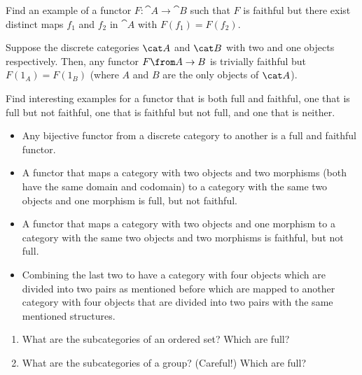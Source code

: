 \begin{exercise}
  Find an example of a functor $F : \cat{A} \to \cat{B}$ such that $F$ is faithful but there exist distinct maps $f_1$ and $f_2$ in $\cat{A}$ with $F(f_1) = F(f_2)$.
\end{exercise}

\begin{answer}
  Suppose the discrete categories $\A$ and $\B$ with two and one objects respectively. Then, any functor $F\from A\to B$ is trivially faithful but $F(1_A)=F(1_B)$ (where $A$ and $B$ are the only objects of $\A$).
\end{answer}

\begin{exercise}
  Find interesting examples for a functor that is both full and faithful, one that is full but not faithful, one that is faithful but not full, and one that is neither.
\end{exercise}

\begin{answer}
\begin{itemize}
\item Any bijective functor from a discrete category to another is a full and faithful functor.
\item A functor that maps a category with two objects and two morphisms (both have the same domain and codomain) to a category with the same two objects and one morphism is full, but not faithful.
\item A functor that maps a category with two objects and one morphism to a category with the same two objects and two morphisms is faithful, but not full.
\item Combining the last two to have a category with four objects which are divided into two pairs as mentioned before which are mapped to another category with four objects that are divided into two pairs with the same mentioned structures.
\end{itemize}
\end{answer}

\begin{exercise}
  \begin{enumerate}
    \item What are the subcategories of an ordered set? Which are full?
    \item What are the subcategories of a group? (Careful!)
      Which are full?
  \end{enumerate}
\end{exercise}

